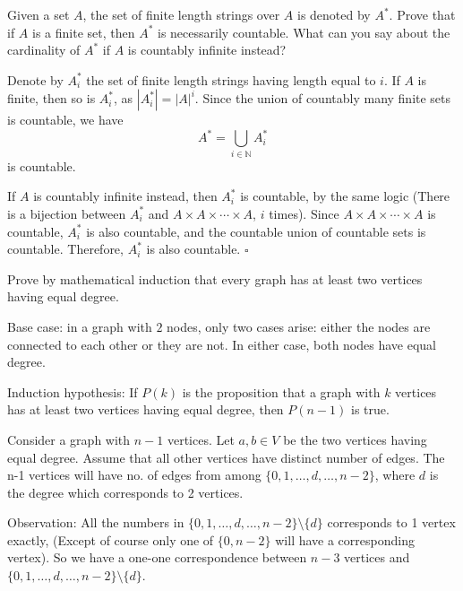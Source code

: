 \documentclass[12pt,answers]{exam}
\begin{document}
\begin{questions}
\question Given a set $A$, the set of finite length strings over $A$ is denoted by $A^*$. Prove that if $A$ is a finite set, then $A^*$ is necessarily countable. What can you say about the cardinality of $A^*$ if $A$ is countably infinite instead?
\begin{solution}
Denote by $A^*_i$ the set of finite length strings having length equal to $i$. If $A$ is finite, then so is $A^*_i$, as $|A^*_i| = |A|^i$. Since the union of countably many finite sets is countable, we have $$A^* = \bigcup_{i \in \mathbb{N}}A^*_i$$ is countable.

If $A$ is countably infinite instead, then $A^*_i$ is countable, by the same logic (There is a bijection between $A^*_i$ and $A \times A \times \cdots \times A$, $i$ times). Since $A \times A \times \cdots \times A$ is countable, $A^*_i$ is also countable, and the countable union of countable sets is countable. Therefore, $A_i^*$ is also countable. \hfill $\square$
\end{solution}

\question Prove by mathematical induction that every graph has at least two vertices having equal degree.
\begin{solution}

Base case: in a graph with $2$ nodes, only two cases arise: either the nodes are connected to each other or they are not. In either case, both nodes have equal degree.

Induction hypothesis: If $P(k)$ is the proposition that a graph with $k$ vertices has at least two vertices having equal degree, then $P(n-1)$ is true.

Consider a graph with $n-1$ vertices. Let $a,b \in V$ be the two vertices having equal degree. Assume that all other vertices have distinct number of edges. The n-1 vertices will have no. of edges from among $\{0,1, \ldots, d, \ldots, n-2 \}$, where $d$ is the degree which corresponds to 2 vertices.

Observation: All the numbers in $\{0,1, \ldots, d, \ldots, n-2 \} \setminus \{d\}$ corresponds to 1 vertex exactly, (Except of course only one of $\{0,n-2\}$ will have a corresponding vertex). So we have a one-one correspondence between $n-3$ vertices and $\{0,1, \ldots,d,\ldots,n-2 \} \setminus \{d\}$.


\end{solution}
\end{questions}
\end{document}
